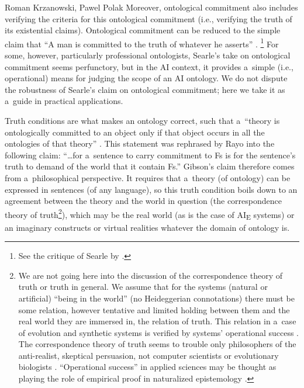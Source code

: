 \begin{artengenv2auth}{Roman Krzanowski, Pawel Polak}
Moreover, ontological commitment also includes verifying the criteria for this ontological commitment (i.e., verifying the truth of its existential claims). Ontological commitment can be reduced to the simple claim that ``A man is committed to the truth of whatever he asserts''
\parencite[][p.112]{searle_speech_1969}.%
\footnote{See the critique of Searle by 
\parencite[][]{lepore_searle_1991}.%
} For some, however, particularly professional ontologists, Searle's take on ontological commitment seems perfunctory, but in the AI context, it provides a~simple (i.e., operational) means for judging the scope of an AI ontology. We do not dispute the robustness of Searle's claim on ontological commitment; here we take it as a~guide in practical applications.

Truth conditions are what makes an ontology correct, such that a~``theory is ontologically committed to an object only if that object occurs in all the ontologies of that theory''
\parencite[][p.631]{gibson_ontological_2009}. %
 This statement was rephrased by Rayo 
\parencite*[][]{rayo_ontological_2007} %
 into the following claim: ``…for a~sentence to carry commitment to Fs is for the sentence's truth to demand of the world that it contain Fs.'' Gibson's claim therefore comes from a~philosophical perspective. It requires that a~theory (of ontology) can be expressed in sentences (of any language), so this truth condition boils down to an agreement between the theory and the world in question (the correspondence theory of truth\footnote{We are not going here into the discussion of the correspondence theory of truth or truth in general. We assume that for the systems (natural or artificial) ``being in the world'' (no Heideggerian connotations) there must be some relation, however tentative and limited holding between them and the real world they are immersed in, the relation of truth. This relation in a~case of evolution and synthetic systems is verified by systems' operational success 
\parencite[see for example the discussion of truth relation in][]{bird_thomas_2000}. %
 The correspondence theory of truth seems to trouble only philosophers of the anti-realist, skeptical persuasion, not computer scientists or evolutionary biologists 
\parencite[][]{bird_thomas_2000}. %
 ``Operational success'' in applied sciences may be thought as playing the role of empirical proof in naturalized epistemology 
\parencite[][p.263]{bird_thomas_2000}. %
 }), which may be the real world (as is the case of AI\textsubscript{E} systems) or an imaginary constructs or virtual realities whatever the domain of ontology is.


\end{artengenv2auth}

